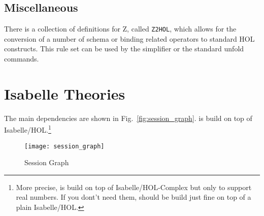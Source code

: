 \documentclass[10pt,a4paper,bigheadings,pdftex,bibtotoc,chapterprefix,appendixprefix,twoside,DIVcalc]{scrbook}
\begin{document}
\section{Miscellaneous}
There is a collection of definitions for Z, called \verb+Z2HOL+, which
allows for the conversion of a number of schema or binding related
operators to standard HOL constructs. This rule set can be used by the
simplifier or the standard unfold commands.


\chapter{Isabelle Theories}
The main dependencies  are shown in Fig.~\vref{fig:session_graph}.  is build on top 
of Isabelle/HOL.\footnote{More precise,  is build on top 
of Isabelle/HOL-Complex but only to support real numbers. If you dont't
need them,  should be build just fine on top of a plain Isabelle/HOL.}

\begin{figure}
  \begin{center}
    \texttt{[image: session\_graph]}
  \end{center}
  \caption{Session Graph\label{fig:session_graph}}
\end{figure}


%
%
\end{document}
